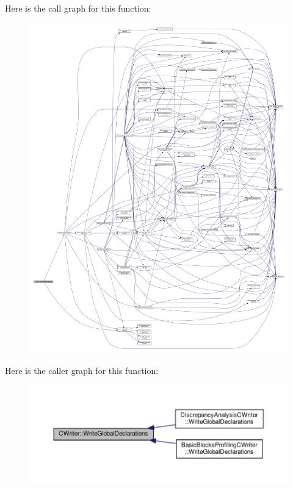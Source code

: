 Here is the call graph for this function\+:
\nopagebreak
\begin{figure}[H]
\begin{center}
\leavevmode
\includegraphics[width=350pt]{d3/d59/classCWriter_a42b2b558bd1efb2dc637664f5df4df28_cgraph}
\end{center}
\end{figure}
Here is the caller graph for this function\+:
\nopagebreak
\begin{figure}[H]
\begin{center}
\leavevmode
\includegraphics[width=350pt]{d3/d59/classCWriter_a42b2b558bd1efb2dc637664f5df4df28_icgraph}
\end{center}
\end{figure}
\mbox{\label{classCWriter_a22766bb22fb01e96257b27095bf035ef}} 
